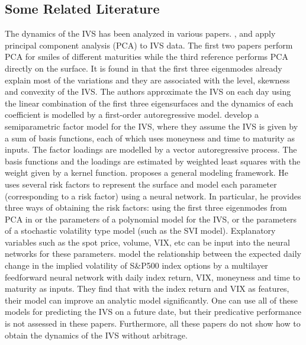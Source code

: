 \documentclass[11pt,a4paper]{article}
\theoremstyle{remark}
\begin{document}
\subsection{Some Related Literature}

The dynamics of the IVS has been analyzed in various papers. \cite{skiadopoulos2000dynamics}, \cite{fengler2003dynamics} and \cite{cont2002dynamics} apply principal component analysis (PCA) to IVS data. The first two papers perform PCA for smiles of different maturities while the third reference performs PCA directly on the surface. It is found in \cite{cont2002dynamics} that the first three eigenmodes already explain most of the variations and they are associated with the level, skewness and convexity of the IVS. The authors approximate the IVS on each day using the linear combination of the first three eigensurfaces and the dynamics of each coefficient is modelled by a first-order autoregressive model. \cite{fengler2007semiparametric} develop a semiparametric factor model for the IVS, where they assume the IVS is given by a sum of basis functions, each of which uses moneyness and time to maturity as inputs. The factor loadings are modelled by a vector autoregressive process. The basis functions and the loadings are estimated by weighted least squares with the weight given by a kernel function. 
\cite{bloch2019neural} proposes a general modeling framework. He uses several risk factors to represent the surface and model each parameter (corresponding to a risk factor) using a neural network. In particular, he provides three ways of obtaining the risk factors: using the first three eigenmodes from PCA in \cite{cont2002dynamics} or the parameters of a polynomial model for the IVS, or the parameters of a stochastic volatility type model (such as the SVI model). Explanatory variables such as the spot price, volume, VIX, etc can be input into the neural networks for these parameters. \cite{cao2020neural} model the relationship between the expected daily change in the implied volatility of S\&P500 index options by a multilayer feedforward neural network with daily index return, VIX, moneyness and time to maturity as inputs. They find that with the index return and VIX as features, their model can improve an analytic model significantly. One can use all of these models for predicting the IVS on a future date, but their predicative performance is not assessed in these papers. Furthermore, all these papers do not show how to obtain the dynamics of the IVS without arbitrage. 
\end{document}
